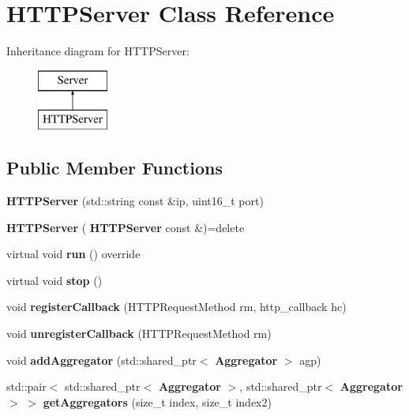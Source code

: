 \section{H\+T\+T\+P\+Server Class Reference}
\label{classHTTPServer}
Inheritance diagram for H\+T\+T\+P\+Server\+:\begin{figure}[H]
\begin{center}
\leavevmode
\includegraphics[height=2.000000cm]{classHTTPServer}
\end{center}
\end{figure}
\subsection*{Public Member Functions}
\begin{DoxyCompactItemize}
\item 
\mbox{\label{classHTTPServer_a530d7b707c153ba00fb3d4a2d5459902}} 
{\bfseries H\+T\+T\+P\+Server} (std\+::string const \&ip, uint16\+\_\+t port)
\item 
\mbox{\label{classHTTPServer_abb6bf7244a484a6c42655cc81c81a849}} 
{\bfseries H\+T\+T\+P\+Server} (\textbf{ H\+T\+T\+P\+Server} const \&)=delete
\item 
\mbox{\label{classHTTPServer_a54f4a0dfd8aef21f1e199895a943cf47}} 
virtual void {\bfseries run} () override
\item 
\mbox{\label{classHTTPServer_a77d828f4aedcc8d447c07a32d2751ad0}} 
virtual void {\bfseries stop} ()
\item 
\mbox{\label{classHTTPServer_af60f462e8528166d8fda1cdca0d25d74}} 
void {\bfseries register\+Callback} (H\+T\+T\+P\+Request\+Method rm, http\+\_\+callback hc)
\item 
\mbox{\label{classHTTPServer_a2a80b1a0a8cf26626d2ac60ad2b3d2ac}} 
void {\bfseries unregister\+Callback} (H\+T\+T\+P\+Request\+Method rm)
\item 
\mbox{\label{classHTTPServer_ae23025f4d2611a100d34ef521598360f}} 
void {\bfseries add\+Aggregator} (std\+::shared\+\_\+ptr$<$ \textbf{ Aggregator} $>$ agp)
\item 
\mbox{\label{classHTTPServer_a59dcc2e7f22cc446e5e75217fb319c19}} 
std\+::pair$<$ std\+::shared\+\_\+ptr$<$ \textbf{ Aggregator} $>$, std\+::shared\+\_\+ptr$<$ \textbf{ Aggregator} $>$ $>$ {\bfseries get\+Aggregators} (size\+\_\+t index, size\+\_\+t index2)
\end{DoxyCompactItemize}
